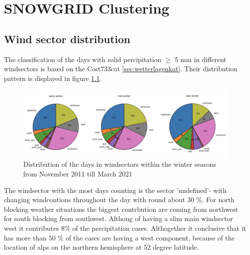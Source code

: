 \chapter{SNOWGRID Clustering}



\section{Wind sector distribution}

The classification of the days with solid percipitation $\geq$ 5 mm in different windsectors is based on 
the Cost733cat \ref{sec:wetterlagenkat}. Their distribution pattern is displayed in figure 
\ref{fig:wind_distribution}. 

\begin{figure}[ht]
    \centering
    \includegraphics[width=\textwidth]{Figures/figures_snowgrid/windsector_seasons.jpg}
    \caption{Distribution of the days in windsectors within the winter seasons 
    from November 2011 till March 2021}
    \label{fig:wind_distribution}
\end{figure}

\noindent The windsector with the most days counting is the sector 'undefined'- with changing windcontions 
throughout the day with round about 30 \%. For north blocking weather situations the biggest contrbution are 
coming from northwest for south blocking from southwest. Althoug of having a slim main windsector west it contributes 
8\% of the percipitation cases. Althogether it conclusive that it has more than 50 \% of the cases are having 
a west component, because of the location of alps on the northern hemisphere at 52 degree latitude. 

